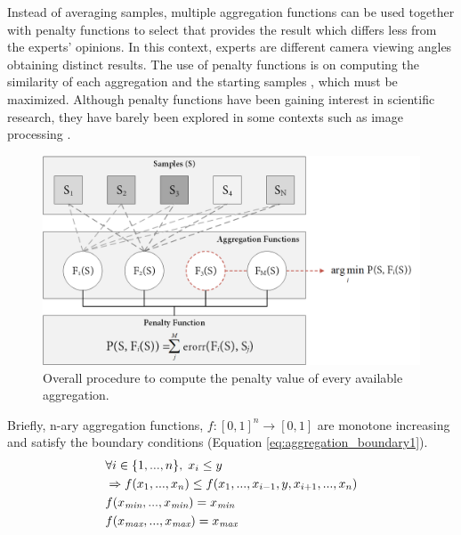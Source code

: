 Instead of averaging samples, multiple aggregation functions can be used together with penalty functions to select that provides the result which differs less from the experts' opinions. In this context, experts are different camera viewing angles obtaining distinct results. The use of penalty functions is on computing the similarity of each aggregation and the starting samples \cite{bustince_definition_2017, bustince_penalty_2017}, which must be maximized. Although penalty functions have been gaining interest in scientific research, they have barely been explored in some contexts such as image processing \cite{paternain_color_2012}. 

\begin{figure}[ht]
	\includegraphics[width=\linewidth]{figs/fundamentals/penalty_functions.png}
	\caption{Overall procedure to compute the penalty value of every available aggregation.}
	\label{fig:penalty_funtions}
\end{figure}
Briefly, n-ary aggregation functions, $f: [0, 1]^n \rightarrow [0, 1]$ are monotone increasing and satisfy the boundary conditions (Equation \ref{eq:aggregation_boundary1}).  
\begin{gather}
    \begin{aligned}
        &\forall i \in \{1,...,n\}, \hspace{1mm} x_i \leq y\\
        &\Rightarrow f(x_1,...,x_n) \leq f(x_1,..., x_{i-1}, y, x_{i+1},...,x_n)\\
        &f(x_{\textit{min}},...,x_{\textit{min}}) = x_{\textit{min}}\\
        &f(x_{\textit{max}},...,x_{\textit{max}}) = x_{\textit{max}}
    \end{aligned}
    \label{eq:aggregation_boundary1}
\end{gather}

